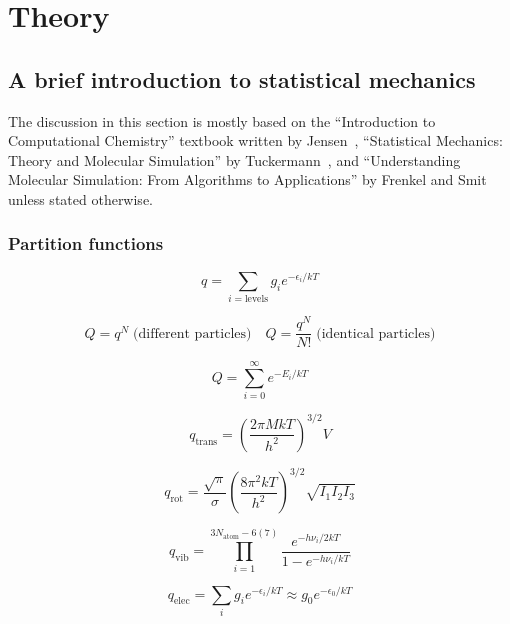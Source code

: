 \chapter{Theory}

\section{A brief introduction to statistical mechanics}
The discussion in this section is mostly based on the ``Introduction to Computational Chemistry'' textbook written by Jensen~\citep{jensenIntroductionComputationalChemistry2017}, ``Statistical Mechanics: Theory and Molecular Simulation'' by Tuckermann~\citep{tuckermanStatisticalMechanicsTheory2023}, and ``Understanding Molecular Simulation: From Algorithms to Applications'' by Frenkel and Smit~\citep{frenkelUnderstandingMolecularSimulation2002} unless stated otherwise.



\subsection{Partition functions}

\begin{equation}
q = \sum_{i = \text{levels}} g_i e^{-\epsilon_i/kT}
\end{equation}

\begin{equation}
Q = q^N \; \text{(different particles)} \quad Q = \frac{q^N}{N!} \; \text{(identical particles)}
\end{equation}

\begin{equation}
Q = \sum_{i=0}^{\infty} e^{-E_i/kT}
\end{equation}

\begin{equation}
q_{\text{trans}} = \left(\frac{2\pi MkT}{h^2}\right)^{3/2} V
\end{equation}

\begin{equation}
q_{\text{rot}} = \frac{\sqrt{\pi}}{\sigma}\left(\frac{8\pi^2kT}{h^2}\right)^{3/2} \sqrt{I_1I_2I_3}
\end{equation}

\begin{equation}
q_{\text{vib}} = \prod_{i=1}^{3N_{\text{atom}}-6(7)} \frac{e^{-h\nu_i/2kT}}{1-e^{-h\nu_i/kT}}
\end{equation}

\begin{equation}
q_{\text{elec}} = \sum_{i} g_i e^{-\epsilon_i/kT} \approx g_0 e^{-\epsilon_0/kT}
\end{equation}

